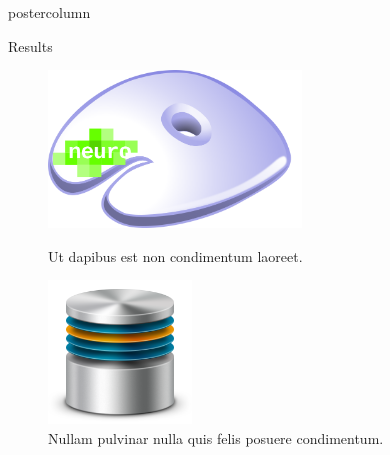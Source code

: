 \documentclass{beamer}
\begin{document}
\begin{frame}
\begin{columns}
\begin{column}{.57\textwidth}
\begin{beamercolorbox}[center]{postercolumn}
\begin{minipage}{.98\textwidth}
{\begin{myblock}{Results}
						\vspace{0.5em}
						\begin{figure}
							\begin{minipage}{0.43\textwidth}
								\centering\includegraphics[width=0.6\textwidth]{img/ng_large.png}
								\caption{Ut dapibus est non condimentum laoreet.}
							\end{minipage}
							\hspace{1em}
							\begin{minipage}{0.45\textwidth}
								\centering\includegraphics[width=0.34\textwidth]{img/db.png}
								\caption{Nullam pulvinar nulla quis felis posuere condimentum.}
							\end{minipage}
						\end{figure}
					\end{myblock}\vfill
					
}
\end{minipage}
\end{beamercolorbox}
\end{column}
\end{columns}
\end{frame}
\end{document}
